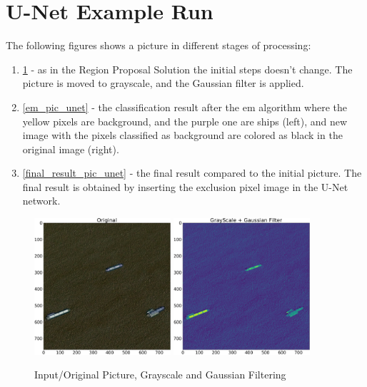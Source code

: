\section{U-Net Example Run}
The following figures shows a picture in different stages of processing:
\begin{enumerate}
	\item \ref{orig_pic_unet} - as in the Region Proposal Solution the initial steps doesn't change. The picture is moved to grayscale, and the Gaussian filter is applied.
	\item \ref{em_pic_unet} - the classification result after the em algorithm where the yellow pixels are background, and the purple one are ships (left), and new image with the pixels classified as background are colored as black in the original image (right).
	\item \ref{final_result_pic_unet} - the final result compared to the initial picture. The final result is obtained by inserting the exclusion pixel image in the U-Net network.
\end{enumerate}
\begin{figure}[h]
	\centering
	\includegraphics[width=0.45\textwidth]{Pictures/011Original.png}
	\includegraphics[width=0.45\textwidth]{Pictures/011GrayScale.png}
	\caption{Input/Original Picture, Grayscale and Gaussian Filtering}
	\label{orig_pic_unet}
\end{figure}
